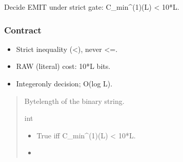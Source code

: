 \documentclass[letterpaper,10pt,english]{sphinxmanual}
\begin{document}

\begin{fulllineitems}
\label{\detokenize{api_reference:clf_calculator.should_emit}}
\pysigstartsignatures
\pysiglinewithargsret
{}
{}
{}
\pysigstopsignatures
\sphinxAtStartPar
Decide EMIT under strict gate: C\_min\textasciicircum{}(1)(L) \textless{} 10*L.


\subsubsection{Contract}
\label{\detokenize{api_reference:id1}}\begin{itemize}
\item {} 
\sphinxAtStartPar
Strict inequality (\textless{}), never \textless{}=.

\item {} 
\sphinxAtStartPar
RAW (literal) cost: 10*L bits.

\item {} 
\sphinxAtStartPar
Integer\sphinxhyphen{}only decision; O(log L).

\end{itemize}
\begin{quote}\begin{description}
\sphinxAtStartPar
{}

\sphinxAtStartPar
Byte\sphinxhyphen{}length of the binary string.

\sphinxAtStartPar
int

\sphinxAtStartPar
{}

\begin{itemize}
\item {} 
\sphinxAtStartPar
{} \textendash{} True iff C\_min\textasciicircum{}(1)(L) \textless{} 10*L.

\item {} 
\sphinxAtStartPar
{}


\end{itemize}
\end{description}
\end{quote}
\end{fulllineitems}
\end{document}
